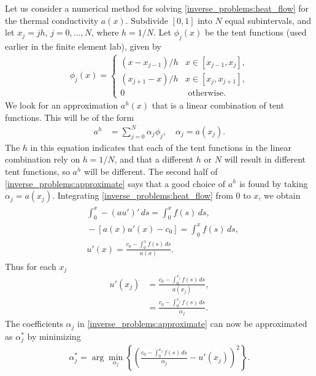 Let us consider a numerical method for solving \eqref{inverse_problems:heat_flow} for the thermal conductivity $a(x)$.
Subdivide $[0,1]$ into $N$ equal subintervals, and let $x_j = jh$, $j = 0, \ldots,N$, where $h = 1/N$.
Let $\phi_j(x)$ be the tent functions (used earlier in the finite element lab), given by
\begin{align*}
	\phi_j(x) = \begin{cases}
(x - x_{j-1})/h  &  x \in [x_{j-1},x_j],\\
 (x_{j+1} - x)/h  &  x \in [x_{j},x_{j+1}],\\
0 & \text{ otherwise.}
\end{cases}
\end{align*}
We look for an approximation $a^h(x)$ that is a linear combination of tent functions. This will be of the form
\begin{align}
	a^h &= \sum_{j=0}^N \alpha_j \phi_j, \quad \alpha_j=a(x_j).
\label{inverse_problems:approximate}
\end{align}
The $h$ in this equation indicates that each of the tent functions in the linear combination rely on $h= 1/N$, and that a different $h$ or $N$ will result in different tent functions, so $a^h$ will be different.
The second half of \eqref{inverse_problems:approximate} says that a good choice of $a^h$ is found by taking $\alpha_j = a(x_j)$.
Integrating \eqref{inverse_problems:heat_flow} from $0$ to $x$, we obtain
\begin{align}
\begin{split}
&{} \int_0^x -(au')'\, ds = \int_0^x f(s)\, ds,\\
&{} -[a(x)u'(x) - c_0] = \int_0^x f(s)\, ds,\\
&{} u'(x) = \frac{c_0 - \int_0^x f(s)\, ds}{a(x)}.
\end{split}
\end{align}
Thus for each $x_j$
\begin{align*}
	u'(x_j) &= \frac{c_0 - \int_0^{x_j} f(s)\, ds}{a(x_j)},\\
	&= \frac{c_0 - \int_0^{x_j} f(s)\, ds}{\alpha_j}.
\end{align*}
The coefficients $\alpha_j$ in \eqref{inverse_problems:approximate} can now be approximated as $\alpha^*_j$ by minimizing
\begin{align}
	\alpha^*_j = \arg\min_{\alpha_j}\left\{\left( \frac{c_0 - \int_0^{x_j} f(s)\, ds}{\alpha_j} - u'(x_j)  \right)^2\right\}.
\label{eqn:inverse:min_alpha}
\end{align}



